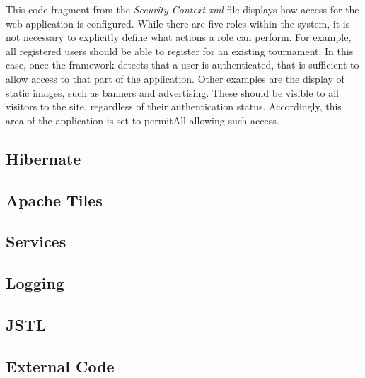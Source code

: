 This code fragment from the \textit{Security-Context.xml} file displays how access for the web application is configured. While there are five roles within the system, it is not necessary to explicitly define what actions a role can perform. For example, all registered users should be able to register for an existing tournament. In this case, once the framework detects that a user is authenticated, that is sufficient to allow access to that part of the application. Other examples are the display of static images, such as banners and advertising. These should be visible to all visitors to the site, regardless of their authentication status. Accordingly, this area of the application is set to permitAll allowing such access.

\subsection{Hibernate}

\subsection{Apache Tiles}

\subsection{Services}

\subsection{Logging}

\subsection{JSTL}

\subsection{External Code}

